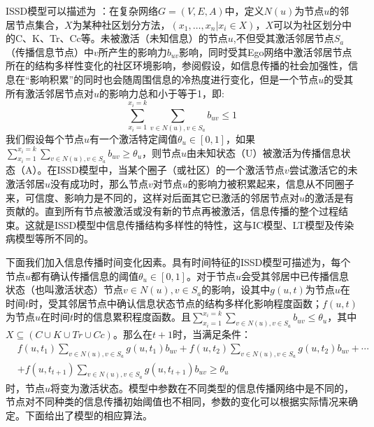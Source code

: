 ISSD模型可以描述为
：在复杂网络$G=(V,E,A)$中，定义$N(u)$为节点$u$的邻居节点集合，$X$为某种社区划分方法，$(x_1,\dots,x_n|x_i \in X)$，$X$可以为社区划分中的C、K、Tr、Cc等。未被激活（未知信息）的节点$u$,不但受其激活邻居节点$S_a$（传播信息节点）中$v$所产生的影响力$b_{uv}$影响，同时受其Ego网络中激活邻居节点所在的结构多样性变化的社区环境影响，参阅假设，如信息传播的社会加强性，信息在“影响积累”的同时也会随周围信息的冷热度进行变化，但是一个节点$u$的受其所有激活邻居节点对$u$的影响力总和小于等于1，即:
\begin{equation} 
{\sum_{x_i=1}^{x_i=k}   {\sum_{v \in N(u),v\in S_a}} b_{uv} \leq 1} 
\end{equation}
我们假设每个节点$u$有一个激活特定阈值$\theta_u\in\left[0,1\right]$，如果${\sum_{x_i=1}^{x_i=k}   {\sum_{v \in N(u),v\in S_a}} b_{uv} \geq \theta_u}$，则节点$u$由未知状态（U）被激活为传播信息状态（A）。在ISSD模型中，当某个圈子（或社区）的一个激活节点$v$尝试激活它的未激活邻居$u$没有成功时，那么节点$v$对节点$u$的影响力被积累起来，信息从不同圈子来，可信度、影响力是不同的，这样对后面其它已激活的邻居节点对$u$的激活是有贡献的。直到所有节点被激活或没有新的节点再被激活，信息传播的整个过程结束。这就是ISSD模型中信息传播结构多样性的特性，这与IC模型、LT模型及传染病模型等所不同的。

下面我们加入信息传播时间变化因素。具有时间特征的ISSD模型可描述为，每个节点$u$都有确认传播信息的阈值$\theta_u \in [0,1]$。对于节点$u$会受其邻居中已传播信息状态（也叫激活状态）节点$v\in N(u), v\in S_a$的影响，设其中$g(u,t)$为节点$u$在时间$t$时，受其邻居节点中确认信息状态节点的结构多样化影响程度函数；$f(u,t)$为节点$u$在时间$t$时的信息累积程度函数。且${\sum_{x_i=1}^{x_i=k}   {\sum_{v \in N(u),v\in S_a}} b_{uv} \le \theta_u}$，其中$X \subseteq ({C\cup K\cup Tr\cup Cc}) $。那么在$t + 1$时，当满足条件：
\begin{equation}
\label{chap05infocoolsumtheta}
\begin{split}
& f(u,t_1){\sum_{v \in N(u),v\in S_a}} g(u,t_1)b_{uv} + f(u,t_2){\sum_{v \in N(u),v\in S_a}} g(u,t_2)b_{uv} + \cdots \\
& + f(u,t_{t+1}){\sum_{v \in N(u),v\in S_a}} g(u,t_{t+1})b_{uv}  \geq \theta _u
\end{split}
\end{equation}
时，节点$u$将变为激活状态。模型中参数在不同类型的信息传播网络中是不同的，节点对不同种类的信息传播初始阈值也不相同，参数的变化可以根据实际情况来确定。下面给出了模型的相应算法。

